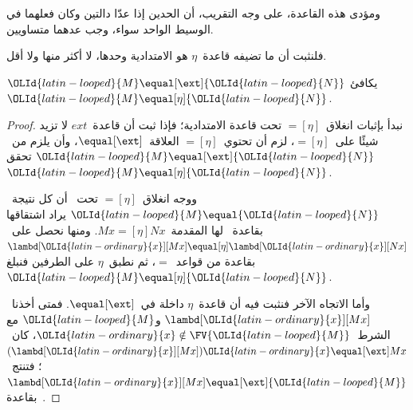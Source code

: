 \documentclass[../../../include/open-logic-section]{subfiles}
\begin{document}
ومؤدى هذه القاعدة، على وجه التقريب، أن الحدين إذا عدّا دالتين وكان
فعلهما في الوسيط الواحد سواء، وجب عدهما متساويين.

فلنثبت أن ما تضيفه قاعدة~$\eta$ هو الامتدادية وحدها، لا أكثر منها ولا أقل.

\begin{thm}
  ${\OLId{latin-looped}{M}} \equal[\ext] {\OLId{latin-looped}{N}}$ يكافئ~${\OLId{latin-looped}{M}} \equal[\eta] {\OLId{latin-looped}{N}}$.
\end{thm}

\begin{proof}
  نبدأ بإثبات انغلاق~$\equal[\eta]$ تحت قاعدة الامتدادية؛ فإذا ثبت
  أن قاعدة~$ext$ لا تزيد شيئًا على~$\equal[\eta]$، لزم أن تحتوي~$\equal[\eta]$
  العلاقة~$\equal[\ext]$، وأن يلزم من~${\OLId{latin-looped}{M}} \equal[\ext] {\OLId{latin-looped}{N}}$ تحقق~${\OLId{latin-looped}{M}}
  \equal[\eta] {\OLId{latin-looped}{N}}$.

  ووجه انغلاق~$\equal[\eta]$ تحت~\ext{} أن كل نتيجة~${\OLId{latin-looped}{M}} \equal {\OLId{latin-looped}{N}}$
  يراد اشتقاقها بقاعدة~\ext{} لها المقدمة~$Mx \equal[\eta] Nx$.
  ومنها نحصل على~$\lambd[{\OLId{latin-ordinary}{x}}][Mx] \equal[\eta] \lambd[{\OLId{latin-ordinary}{x}}][Nx]$
  بقاعدة من قواعد~$\equal$، ثم نطبق~$\eta$ على الطرفين فنبلغ~${\OLId{latin-looped}{M}} \equal[\eta] {\OLId{latin-looped}{N}}$.

  وأما الاتجاه الآخر فنثبت فيه أن قاعدة~$\eta$ داخلة في~$\equal[\ext]$.
  فمتى أخذنا~$\lambd[{\OLId{latin-ordinary}{x}}][Mx]$ و${\OLId{latin-looped}{M}}$ مع الشرط~${\OLId{latin-ordinary}{x}} \notin \FV{{\OLId{latin-looped}{M}}}$،
  كان~$(\lambd[{\OLId{latin-ordinary}{x}}][Mx]){\OLId{latin-ordinary}{x}} \equal[\ext] Mx$؛
  فتنتج~$\lambd[{\OLId{latin-ordinary}{x}}][Mx] \equal[\ext] {\OLId{latin-looped}{M}}$ بقاعدة~\ext{}.
\end{proof}
\end{document}

